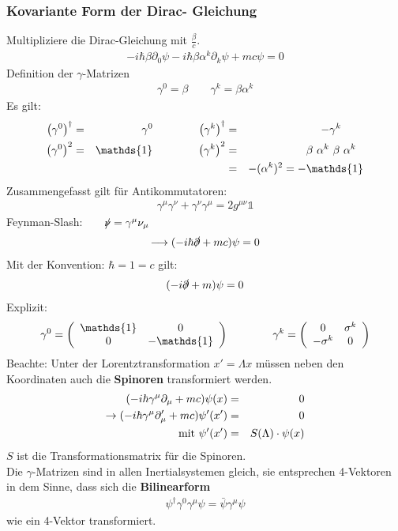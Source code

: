 \subsubsection{Kovariante Form der Dirac- Gleichung}
Multipliziere die Dirac-Gleichung mit $\frac \beta c$.
\begin{eqnarray*}
-i\hbar \beta \partial_0 \psi - i \hbar \beta\alpha^k \partial_k\psi + m c \psi = 0
\end{eqnarray*}
Definition der $\gamma$-Matrizen
\begin{eqnarray*} \boxed{ \gamma^0 = \beta \quad \quad \gamma^k = \beta \alpha^k}\end{eqnarray*}
Es gilt:
\begin{alignat*}{4}
\left(\gamma^0\ri)^\dagger \g \ \gamma^0 \qquad \qquad \left(\gamma^k \ri)^\dagger \g - \gamma ^k\qquad\\
\left(\gamma^0 \ri)^2 \g \mathds{1} \qquad\qquad \left(\gamma^k \ri)^2 \g \beta \ \alpha^k \ \beta\ \alpha^k \ \ \\
&{}&\quad \g-(\alpha^{k})^2 = -\mathds{1}
\end{alignat*}
Zusammengefasst gilt für Antikommutatoren:
\begin{eqnarray*}\boxed{\gamma^{\mu}\gamma^{\nu} + \gamma^{\nu}\gamma^{\mu} = 2 g^{\mu\nu}\mathds{1}}\end{eqnarray*}
Feynman-Slash:$\qquad \slashed{\nu} = \gamma^{\mu}\nu_{\mu}$
\begin{eqnarray*} \longrightarrow (-i\hbar \slashed{\partial} + m c)\psi = 0\end{eqnarray*}
Mit der Konvention: $\hbar = 1 = c$ gilt:
\begin{eqnarray*} (-i\slashed{\partial} + m) \psi = 0\end{eqnarray*}
Explizit:
\begin{eqnarray*} \gamma^0 = \left (\begin{array}{cc} \mathds {1} &0\\0&- \mathds{1}\end{array}\ri) \qquad \qquad \gamma^k = \left( \begin{array}{cc}0 &\sigma^k\\-\sigma^k&  0 \end{array}\ri) \end{eqnarray*}
Beachte: Unter der Lorentztransformation $x' = \Lambda x$ müssen neben den Koordinaten auch die {\bf Spinoren} transformiert werden. 
\begin{eqnarray*}
(-i\hbar \gamma^{\mu}\partial_{\mu} + m c)\psi(x) &=& 0\\
\rightarrow (-i\hbar \gamma^{\mu}\partial_{\mu}'+ m c ) \psi'(x') &=& 0\\
\text{mit  } \psi'(x') &=& S(\Lambda) \cdot \psi(x)
\end{eqnarray*}
$S$ ist die Transformationsmatrix für die Spinoren.\\
Die $\gamma$-Matrizen sind in allen Inertialsystemen gleich, sie entsprechen 4-Vektoren in dem Sinne, dass sich die {\bf Bilinearform}
\begin{eqnarray*} \psi^{\dagger} \gamma^0\gamma^ {\mu} \psi = \bar{\psi}\gamma^{\mu} \psi\end{eqnarray*}
wie ein 4-Vektor transformiert.


